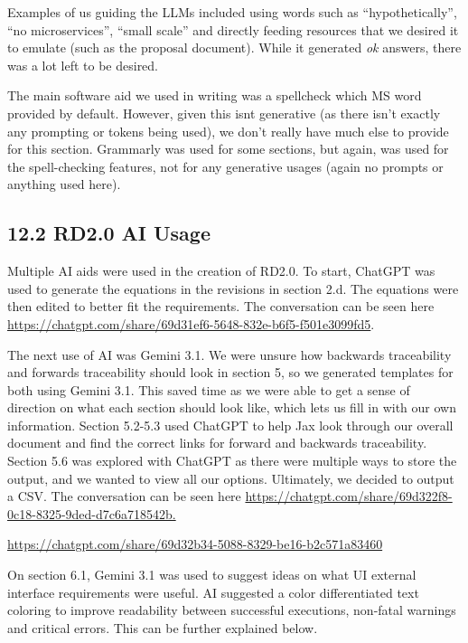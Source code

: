 \documentclass[
]{article}
\begin{document}
Examples of us guiding the LLMs included using words such as
``hypothetically'', ``no microservices'', ``small scale'' and directly
feeding resources that we desired it to emulate (such as the proposal
document). While it generated \emph{ok} answers, there was a lot left to
be desired.

The main software aid we used in writing was a spellcheck which MS word
provided by default. However, given this isn\textquotesingle t
generative (as there isn't exactly any prompting or tokens being used),
we don't really have much else to provide for this section. Grammarly
was used for some sections, but again, was used for the spell-checking
features, not for any generative usages (again no prompts or anything
used here).

 {}\subsection{12.2 RD2.0 AI Usage}\label{rd2.0-ai-usage}

Multiple AI aids were used in the creation of RD2.0. To start, ChatGPT
was used to generate the equations in the revisions in section 2.d. The
equations were then edited to better fit the requirements. The
conversation can be seen here
\url{https://chatgpt.com/share/69d31ef6-5648-832e-b6f5-f501e3099fd5}.

The next use of AI was Gemini 3.1. We were unsure how backwards
traceability and forwards traceability should look in section 5, so we
generated templates for both using Gemini 3.1. This saved time as we
were able to get a sense of direction on what each section should look
like, which lets us fill in with our own information. Section 5.2-5.3
used ChatGPT to help Jax look through our overall document and find the
correct links for forward and backwards traceability. Section 5.6 was
explored with ChatGPT as there were multiple ways to store the output,
and we wanted to view all our options. Ultimately, we decided to output
a CSV. The conversation can be seen here
\href{https://chatgpt.com/share/69d322f8-0c18-8325-9ded-d7c6a718542b}{https://chatgpt.com/share/69d322f8-0c18-8325-9ded-d7c6a718542b.}

\url{https://chatgpt.com/share/69d32b34-5088-8329-be16-b2c571a83460}

On section 6.1, Gemini 3.1 was used to suggest ideas on what UI external
interface requirements were useful. AI suggested a color differentiated
text coloring to improve readability between successful executions,
non-fatal warnings and critical errors. This can be further explained
below.
\end{document}
